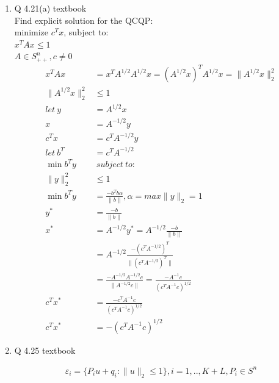 \documentclass[12pt,letter]{article}
\newcommand{\norm}[1]{\|#1\|}
\newcommand{\set}[1]{\{#1\}}
\begin{document}
\begin{enumerate}
  \pagebreak
  
\item Q 4.21(a) textbook\\
  Find explicit solution for the QCQP:\\
  minimize $c^T x$, subject to:\\
  $x^TAx \leq 1$\\
  $A \in S^n_{++}, c \neq 0$\\

  \begin{align*}
    x^TAx & = x^TA^{1/2}A^{1/2}x = (A^{1/2}x)^T A^{1/2}x = \norm{A^{1/2}x}_2^2\\
    \norm{A^{1/2}x}_2^2 & \leq 1\\
    let\ y &= A^{1/2}x\\
    x &= A^{-1/2}y\\
    c^T x &= c^T A^{-1/2}y\\
    let\ b^T &= c^T A^{-1/2}\\
    \min b^T y &\ subject\ to:\\
    \norm{y}_2^2 & \leq 1\\
    \min b^T y & = \frac{-b^Tb \alpha }{\norm{b}}, \alpha = max \norm{y}_2 = 1\\
    y^* & = \frac{-b}{\norm{b}}\\
    x^* &= A^{-1/2}y^* = A^{-1/2} \frac{-b}{\norm{b}}\\
          & = A^{-1/2} \frac{-(c^T A^{-1/2})^T}{\norm{(c^T A^{-1/2})^T}}\\
          & = \frac{-A^{-1/2}A^{-1/2}c}{\norm{A^{-1/2} c}} = \frac{-A^{-1}c}{(c^TA^{-1} c)^{1/2}}\\
    c^Tx^* &= \frac{-c^TA^{-1}c}{(c^TA^{-1} c)^{1/2}}\\
    c^Tx^* &= -(c^TA^{-1} c)^{1/2}
  \end{align*}

  \pagebreak
  
\item Q 4.25 textbook
  
  \begin{align*}
    \varepsilon_i = \set{P_i u + q_i: \norm{u}_2 \leq 1}, i=1,..,K+L, P_i \in S^n
  \end{align*}


\end{enumerate}
\end{document}
